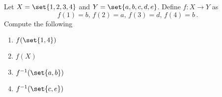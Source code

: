 \guard



\begin{exmp}
\label{exmp:functionAppliedToSet}
  Let $X=\set{1,2,3,4}$ and $Y = \set{a,b,c,d,e}$.
  Define $f:X\to Y$ as \[ f(1)=b,\,f(2)=a,\,f(3)=d,\,f(4)=b\,.\]
  Compute the following
  \begin{enumerate}
    \item $f(\set{1,4})$
    \item $f(X)$
    \item $f^{-1}(\set{a,b})$
    \item $f^{-1}(\set{c,e})$
  \end{enumerate}
\end{exmp}
